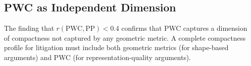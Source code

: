 \subsection{PWC as Independent Dimension}

The finding that $r(\text{PWC}, \text{PP}) < 0.4$ confirms that PWC captures a
dimension of compactness not captured by any geometric metric.
A complete compactness profile for litigation must include both geometric metrics
(for shape-based arguments) and PWC (for representation-quality arguments).

